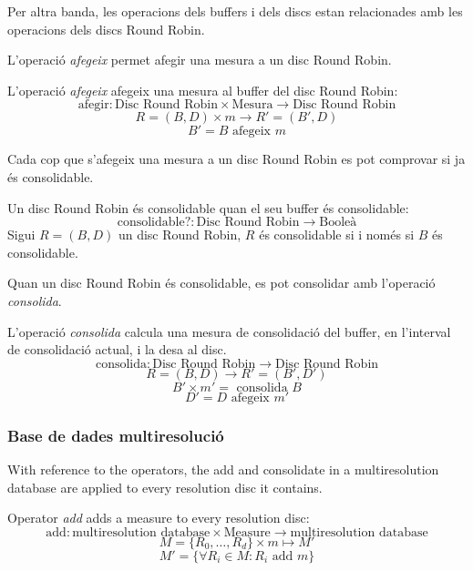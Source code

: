 Per altra banda, les operacions dels buffers i dels discs estan relacionades amb les operacions dels discs Round Robin. 

L'operació \emph{afegeix} permet afegir una mesura a un disc Round Robin.

\begin{definition}
  L'operació \emph{afegeix} afegeix una mesura al buffer del disc Round Robin:
  \[
  \text{afegir}: \text{Disc Round Robin} \times \text{Mesura} \longrightarrow \text{Disc Round Robin}
  \]
  \[
  R=(B,D) \times m \longrightarrow R'= (B',D)
  \]
  \[
  B'= B \text{ afegeix } m
  \]
\end{definition}

Cada cop que s'afegeix una mesura a un disc Round Robin es pot comprovar si ja és consolidable. 

\begin{definition}
  Un disc Round Robin és consolidable quan el seu buffer és consolidable:
  \[
  \text{consolidable?}: \text{Disc Round Robin} \longrightarrow \text{Booleà}
  \]
  Sigui $R=(B,D)$ un disc Round Robin, $R$ és consolidable si i només
  si $B$ és consolidable.
\end{definition}


Quan un disc Round Robin és consolidable, es pot consolidar amb l'operació \emph{consolida}. 

\begin{definition}
  L'operació \emph{consolida} calcula una  mesura de consolidació del buffer, en
  l'interval de consolidació actual, i la desa al disc. 
  \[
  \text{consolida}: \text{Disc Round Robin} \longrightarrow \text{Disc Round Robin}
  \]
  \[
  R=(B,D) \longrightarrow R'= (B',D')
  \]
  \[
  B' \times m'= \text{ consolida } B 
  \]
  \[
  D'= D \text{ afegeix } m'
  \]
\end{definition}





\subsubsection{Base de dades multiresolució}



With reference to the operators, the add and consolidate in a multiresolution database are applied to every resolution disc it contains.


\begin{definition}
  Operator \emph{add} adds a measure to every resolution disc:
  \[
  \text{add}: \text{multiresolution database} \times \text{Measure}
  \longrightarrow \text{multiresolution database}
  \]
  \[
  M=\{R_0,\dotsc,R_d\} \times m \mapsto M' 
  \]
  \[  
  M'= \{ \forall R_i\in M: R_i \text{ add } m \}
  \]
\end{definition}


